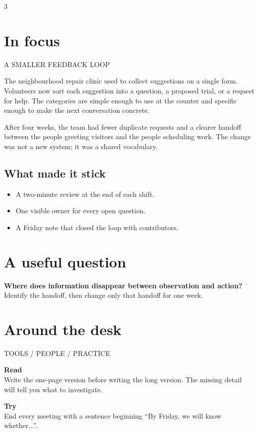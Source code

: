 \documentclass[10pt]{article}
\newcommand{\dateline}[1]{\small\sffamily\color{muted}#1\par\medskip}
\begin{document}
\begin{multicols*}{3}
\columnbreak
\section*{In focus}
\dateline{A SMALLER FEEDBACK LOOP}
The neighbourhood repair clinic used to collect suggestions on a single form. Volunteers now sort each suggestion into a question, a proposed trial, or a request for help. The categories are simple enough to use at the counter and specific enough to make the next conversation concrete.

After four weeks, the team had fewer duplicate requests and a clearer handoff between the people greeting visitors and the people scheduling work. The change was not a new system; it was a shared vocabulary.

\subsection*{What made it stick}
\begin{itemize}
  \item A two-minute review at the end of each shift.
  \item One visible owner for every open question.
  \item A Friday note that closed the loop with contributors.
\end{itemize}

\section*{A useful question}
\begin{dispatch}
\sffamily\textbf{Where does information disappear between observation and action?}\\[4pt]
\small Identify the handoff, then change only that handoff for one week.
\end{dispatch}

\columnbreak
\section*{Around the desk}
\dateline{TOOLS / PEOPLE / PRACTICE}
\textbf{Read}\\
Write the one-page version before writing the long version. The missing detail will tell you what to investigate.

\medskip\textbf{Try}\\
End every meeting with a sentence beginning “By Friday, we will know whether...”.


\end{multicols*}
\end{document}

